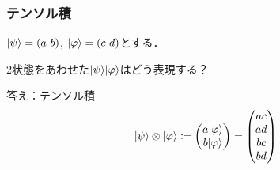\documentclass[
    10pt,
    ]{sotsu-beamer}
\begin{document}
\begin{frame}
    \frametitle{テンソル積}

    $\lvert\psi\rangle = (a \,\, b)$, $\lvert\varphi\rangle = (c \,\, d)$とする．

    2状態をあわせた$\lvert\psi\rangle\lvert\varphi\rangle$はどう表現する？

    \pause

    答え：\alert{テンソル積}
    \begin{equation}
        \lvert\psi\rangle \otimes \lvert\varphi\rangle
            \coloneq \begin{pmatrix}
                a \lvert\varphi\rangle  \\  b \lvert\varphi\rangle
            \end{pmatrix}
            = \begin{pmatrix}
                ac \\ ad \\ bc \\ bd
            \end{pmatrix}
    \end{equation}

\end{frame}
\end{document}
